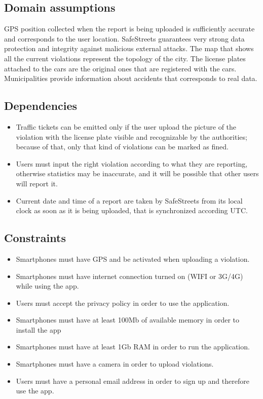 \documentclass[../RASD.tex]{subfiles}
\begin{document}
    \subsection{Domain assumptions}\label{subsec:domain-assumpiton}
    \begin{enumerate}
         GPS position collected when the report is being uploaded is sufficiently accurate and corresponds to the user location.
         SafeStreets guarantees very strong data protection and integrity against malicious external attacks.
         The map that shows all the current violations represent the topology of the city.
         The license plates attached to the cars are the original ones that are registered with the cars.
         Municipalities provide information about accidents that corresponds to real data.
    \end{enumerate}
    \subsection{Dependencies}\label{subsec:dependencies}
    \begin{itemize}
        \item Traffic tickets can be emitted only if the user upload the picture of the violation with the license plate visible and recognizable by the authorities; because of that, only that kind of violations can be marked as fined.
        \item Users must input the right violation according to what they are reporting, otherwise statistics may be inaccurate, and it will be possible that other users will report it.
        \item Current date and time of a report are taken by SafeStreets from its local clock as soon as it is being uploaded, that is synchronized according UTC.
    \end{itemize}
    \subsection{Constraints}\label{subsec:constraints}
    \begin{itemize}
        \item Smartphones must have GPS and be activated when uploading a violation.
        \item Smartphones must have internet connection turned on (WIFI or 3G/4G) while using the app.
        \item Users must accept the privacy policy in order to use the application.
        \item Smartphones must have at least 100Mb of available memory in order to install the app
        \item Smartphones must have at least 1Gb RAM in order to run the application.
        \item Smartphones must have a camera in order to upload violations.
        \item Users must have a personal email address in order to sign up and therefore use the app.
    \end{itemize}
\end{document}

